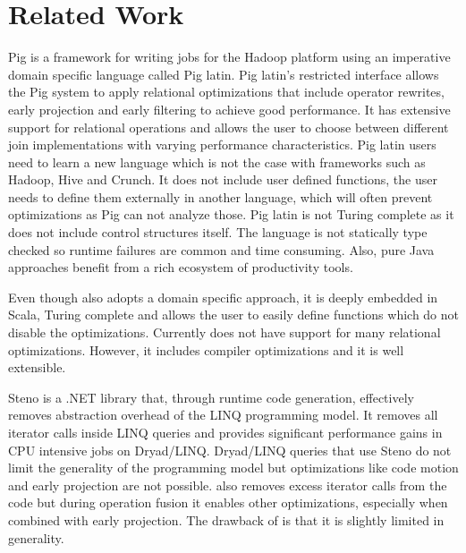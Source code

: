 \section{Related Work}
\label{sec:related-work}

Pig is a framework for writing jobs for the Hadoop platform using an imperative domain specific language called Pig latin. Pig latin's restricted interface allows the Pig system to apply relational optimizations that include operator rewrites, early projection and early filtering to achieve good performance. 
It has extensive support for relational operations and allows the user to choose between different join implementations with varying performance characteristics. Pig latin users need to learn a new language which is not the case with frameworks such as Hadoop, Hive and Crunch. It does not include user defined functions, the user needs to define them externally in another language, which will often prevent optimizations as Pig can not analyze those. Pig latin is not Turing complete as it does not include control structures itself.
The language is not statically type checked so runtime failures are common and time consuming. Also, pure Java approaches benefit from a rich ecosystem of productivity tools. 

Even though \tool also adopts a domain specific approach, it is deeply embedded in Scala, Turing complete and allows the user to easily define functions which do not disable the optimizations. Currently \tool does not have support for many relational optimizations. However, it includes compiler optimizations and it is well extensible.

Steno is a .NET library that, through runtime code generation, effectively removes abstraction overhead of the LINQ programming model. It removes all iterator calls inside LINQ queries and provides significant performance gains in CPU intensive jobs on Dryad/LINQ. Dryad/LINQ queries that use Steno do not limit the generality of the programming model but optimizations like code motion and early projection are not possible. 
\tool also removes excess iterator calls from the code but during operation fusion it enables other optimizations, especially when combined with early projection. The drawback of \tool is that it is slightly limited in generality.

